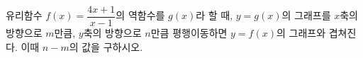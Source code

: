 유리함수 $f(x)=\dfrac{4x+1}{x-1}$의 역함수를 $g(x)$라 할 때, $y=g(x)$의 그래프를 $x$축의 방향으로 $m$만큼, $y$축의 방향으로 $n$만큼 평행이동하면 $y=f(x)$의 그래프와 겹쳐진다. 이때 $n-m$의 값을 구하시오.
